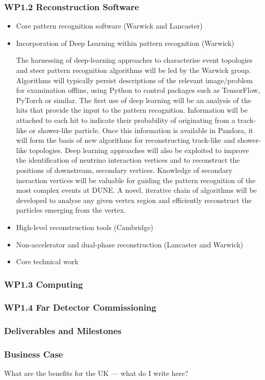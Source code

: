 \subsubsection{WP1.2 Reconstruction Software}

\begin{itemize}

\item {Core pattern recognition software} (Warwick and Lancaster)

\item {Incorporation of Deep Learning within pattern recognition} (Warwick)

The harnessing of deep-learning approaches to characterise event topologies and steer pattern recognition
algorithms will be led by the Warwick group. Algorithms will typically persist descriptions of the relevant
image/problem for examination offline, using Python to control packages such as TensorFlow, PyTorch or similar.
The first use of deep learning will be an analysis of the hits that provide the input to the pattern recognition.
Information will be attached to each hit to indicate their probability of originating from a track-like or
shower-like particle. Once this information is available in Pandora, it will form the basis of new algorithms
for reconstructing track-like and shower-like topologies. Deep learning approaches will also be exploited
to improve the identification of neutrino interaction vertices and to reconstruct the positions of downstream,
secondary vertices. Knowledge of secondary ineraction vertices will be valuable for guiding the pattern
recognition of the most complex events at DUNE. A novel, iterative chain of algorithms will be developed to
analyse any given vertex region and efficiently reconstruct the particles emerging from the vertex.

\item {High-level reconstruction tools} (Cambridge)

\item {Non-accelerator and dual-phase reconstruction} (Lancaster and Warwick)

\item {Core technical work}

\end{itemize}



\subsubsection{WP1.3 Computing}

\subsubsection{WP1.4 Far Detector Commissioning}

\subsubsection{Deliverables and Milestones}

\subsubsection{Business Case}

What are the benefits for the UK --- what do I write here?
